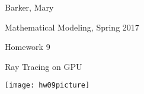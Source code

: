 \documentclass[11pt]{article}
\def \hwnum{9}
\def \hwdescription{Ray Tracing on GPU}
\def \hwscript{hw09.cu}
\begin{document}
{\color{white}{thing}}
\begin{center}
{
	\fontsize{20pt}{20pt}\selectfont
	Barker, Mary
}

\vspace{1cm}

{
	\fontsize{20pt}{20pt}\selectfont
	Mathematical Modeling, Spring 2017
}

\vspace{1cm}

{
	\fontsize{20pt}{20pt}\selectfont
	Homework \hwnum
}

\vspace{1cm}

{
	\fontsize{20pt}{20pt}\selectfont
	\hwdescription
}

\end{center}
\pagebreak
\begin{center}
\texttt{[image: hw09picture]}
\end{center}
\pagebreak

\end{document}
